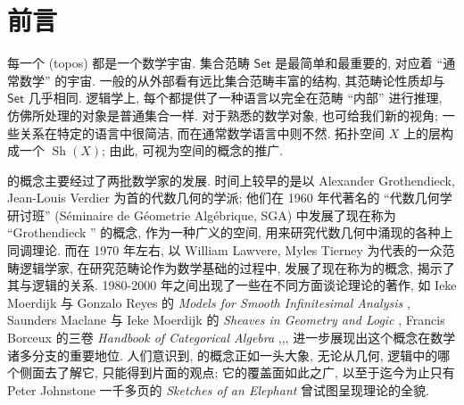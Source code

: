\chapter{前言}



每一个\topos{} (topos) 都是一个数学宇宙. 集合范畴 $\mathsf {Set}$ 是最简单和最重要的\topos{}, 对应着 ``通常数学'' 的宇宙. 一般的\topos{}从外部看有远比集合范畴丰富的结构, 其范畴论性质却与 $\mathsf {Set}$ 几乎相同. 逻辑学上, 每个\topos{}都提供了一种语言以完全在范畴 ``内部'' 进行推理, 仿佛所处理的对象是普通集合一样. 对于熟悉的数学对象, \topos{}也可给我们新的视角; 一些关系在特定\topos{}的语言中很简洁, 而在通常数学语言中则不然. 拓扑空间 $X$ 上的层构成一个\topos{} $\operatorname{Sh}(X)$; 由此, \topos{}可视为空间的概念的推广.



\topos{}的概念主要经过了两批数学家的发展. 时间上较早的是以 Alexander Grothendieck, Jean-Louis Verdier 为首的代数几何的学派; 他们在 1960 年代著名的 ``代数几何学研讨班'' (Séminaire de Géometrie Algébrique, SGA) 中发展了现在称为 ``Grothendieck \topos{}'' 的概念, 作为一种广义的空间, 用来研究代数几何中涌现的各种上同调理论. 而在 1970 年左右, 以 William Lawvere, Myles Tierney 为代表的一众范畴逻辑学家, 在研究范畴论作为数学基础的过程中, 发展了现在称为\topos{}的概念, 揭示了其与逻辑的关系. 1980-2000 年之间出现了一些在不同方面谈论\topos{}理论的著作, 如 Ieke Moerdijk 与 Gonzalo Reyes 的 \emph{Models for Smooth Infinitesimal Analysis} \cite{MSIA}, Saunders Maclane 与 Ieke Moerdijk 的 \emph{Sheaves in Geometry and Logic} \cite{SGL}, Francis Borceux 的三卷 \emph{Handbook of Categorical Algebra} \cite{HCA1},\cite{HCA2},\cite{HCA3}, 进一步展现出这个概念在数学诸多分支的重要地位. 人们意识到, \topos{}的概念正如一头大象, 无论从几何, 逻辑中的哪个侧面去了解它, 只能得到片面的观点; 它的覆盖面如此之广, 以至于迄今为止只有 Peter Johnstone 一千多页的 \textit{Sketches of an Elephant} \cite{Elephant} 曾试图呈现\topos{}理论的全貌.

